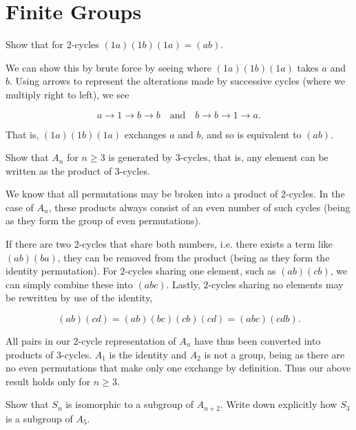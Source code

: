 \documentclass[../group-theory-in-a-nutshell-for-physicists.tex]{subfiles}
\begin{document}
\printanswers

\section{Finite Groups}

\begin{questions}

\question Show that for $2$-cycles $(1a)(1b)(1a) = (ab)$.

\begin{solution}
We can show this by brute force by seeing where $(1a)(1b)(1a)$ takes
$a$ and $b$. Using arrows to represent the alterations made by
successive cycles (where we multiply right to left), we see

\[
a \rightarrow 1 \rightarrow b \rightarrow b \quad \text{and} \quad
b \rightarrow b \rightarrow 1 \rightarrow a.
\]

That is, $(1a)(1b)(1a)$ exchanges $a$ and $b$, and so is equivalent to
$(ab)$.
\end{solution}

\question Show that $A_{n}$ for $n \geq 3$ is generated by $3$-cycles, that
is, any element can be written as the product of $3$-cycles.

\begin{solution}
We know that all permutations may be broken into a product of
$2$-cycles. In the case of $A_{n}$, these products always consist of
an even number of such cycles (being as they form the group of even
permutations).

If there are two $2$-cycles that share both numbers, i.e. there exists
a term like $(ab)(ba)$, they can be removed from the product (being as
they form the identity permutation). For $2$-cycles sharing one
element, such as $(ab)(cb)$, we can simply combine these into
$(abc)$. Lastly, $2$-cycles sharing no elements may be rewritten by
use of the identity,

\[
(ab)(cd) = (ab)(bc)(cb)(cd) = (abc)(cdb).
\]

All pairs in our $2$-cycle representation of $A_{n}$ have thus been
converted into products of $3$-cycles. $A_{1}$ is the identity and
$A_{2}$ is not a group, being as there are no even permutations that
make only one exchange by definition. Thus our above result holds only
for $n \geq 3$.
\end{solution}

\question Show that $S_{n}$ is isomorphic to a subgroup of $A_{n + 2}$. Write
down explicitly how $S_{3}$ is a subgroup of $A_{5}$.


\end{questions}
\end{document}
